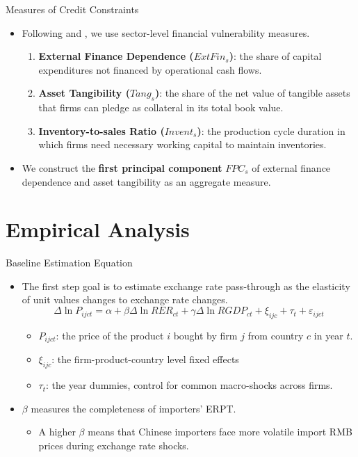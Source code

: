 \documentclass[10pt]{beamer}
\begin{document}
\begin{frame}{Measures of Credit Constraints}
	\begin{itemize}
		\item Following \cite{manova-wei-zhang2015} and \cite{fan-lai-li2015}, we use sector-level financial vulnerability measures.
		\begin{enumerate}
			\item \textbf{External Finance Dependence ($ExtFin_s$)}: the share of capital expenditures not financed by operational cash flows.
			\item \textbf{Asset Tangibility ($Tang_s$)}: the share of the net value of tangible assets that firms can pledge as collateral in its total book value.
			\item \textbf{Inventory-to-sales Ratio ($Invent_s$)}: the production cycle duration in which firms need necessary working capital to maintain inventories.
		\end{enumerate}
            \medskip
		\item We construct the \textbf{first principal component} $FPC_s$ of external finance dependence and asset tangibility as an aggregate measure.
	\end{itemize}
\end{frame}

\section{Empirical Analysis}

\begin{frame}{Baseline Estimation Equation}
    \begin{itemize}
	\item The first step goal is to estimate exchange rate pass-through as the elasticity of unit values changes to exchange rate changes.
	\begin{equation}
		\Delta \ln P_{i j c t}=\alpha+\beta \Delta \ln R E R_{c t}+\gamma \Delta \ln R G D P_{c t}+\xi_{i j c}+\tau_{t}+\varepsilon_{i j c t}
		\label{eq4.1}
	\end{equation}
        \begin{itemize}
            \item $P_{ijct}$: the price of the product $i$ bought by firm $j$ from country $c$ in year $t$.
            \item $\xi_{ijc}$: the firm-product-country level fixed effects
            \item $\tau_t$: the year dummies, control for common macro-shocks across firms.
        \end{itemize}
        \medskip
	\item $\beta$ measures the completeness of importers' ERPT.
        \begin{itemize}
            \item A higher $\beta$ means that Chinese importers face more volatile import RMB prices during exchange rate shocks.
        \end{itemize}
    \end{itemize}
\end{frame}
\end{document}
